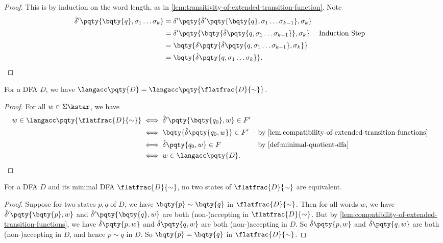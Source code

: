 \begin{proof}
    This is by induction on the word length, as in \autoref{lem:transitivity-of-extended-transition-function}. Note
    \begin{align*}
        \hat{\delta}' \pqty{\bqty{q}, \sigma_1 \ldots \sigma_k} &= \delta' \pqty{\hat{\delta}'\pqty{\bqty{q}, \sigma_1 \ldots \sigma_{k - 1}}, \sigma_k} \\
        &= \delta' \pqty{\bqty{\hat{\delta}\pqty{q, \sigma_1 \ldots \sigma_{k - 1}}}, \sigma_k} && \text{Induction Step} \\
        &= \bqty{\delta\pqty{\hat{\delta}\pqty{q, \sigma_1 \ldots \sigma_{k - 1}}, \sigma_k}} \\
        &= \bqty{\hat{\delta}\pqty{q, \sigma_1 \ldots \sigma_k}}.
    \end{align*}
\end{proof}

\begin{theorem}
    For a DFA \(D\), we have \(\langacc\pqty{D} = \langacc\pqty{\flatfrac{D}{\sim}}\).
\end{theorem}

\begin{proof}
    For all \(w \in \Sigma\kstar\), we have
    \begin{align*}
        w \in \langacc\pqty{\flatfrac{D}{\sim}} &\iff \hat{\delta}'\pqty{\bqty{q_0}, w} \in F' \\
        &\iff \bqty{\hat{\delta}\pqty{q_0, w}} \in F' && \text{by \autoref{lem:compatibility-of-extended-transition-functions}} \\
        &\iff \hat{\delta}\pqty{q_0, w} \in F && \text{by \autoref{def:minimal-quotient-dfa}} \\
        &\iff w \in \langacc\pqty{D}.
    \end{align*}
\end{proof}

\begin{lemma}
    \label{lem:minimal-dfa-has-no-equivalent-states}%
    For a DFA \(D\) and its minimal DFA \(\flatfrac{D}{\sim}\), no two states of \(\flatfrac{D}{\sim}\) are equivalent.
\end{lemma}

\begin{proof}
    Suppose for two states \(p, q\) of \(D\), we have \(\bqty{p} \sim \bqty{q}\) in \(\flatfrac{D}{\sim}\). Then for all words \(w\), we have \(\hat{\delta}' \pqty{\bqty{p}, w}\) and \(\hat{\delta}' \pqty{\bqty{q}, w}\) are both (non-)accepting in \(\flatfrac{D}{\sim}\). But by \autoref{lem:compatibility-of-extended-transition-functions}, we have \(\hat{\delta}\pqty{p, w}\) and \(\hat{\delta}\pqty{q, w}\) are both (non-)accepting in \(D\). So \(\hat{\delta}\pqty{p, w}\) and \(\hat{\delta}\pqty{q, w}\) are both (non-)accepting in \(D\), and hence \(p \sim q\) in \(D\). So \(\bqty{p} = \bqty{q}\) in \(\flatfrac{D}{\sim}\).
\end{proof}

